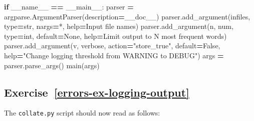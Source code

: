 \documentclass[
]{krantz}
\makeatletter
\newenvironment{Shaded}{\begin{snugshade}}{\end{snugshade}}
\newcommand{\BuiltInTok}[1]{#1}
\newcommand{\ControlFlowTok}[1]{\textcolor[rgb]{0.13,0.29,0.53}{\textbf{#1}}}
\newcommand{\NormalTok}[1]{#1}
\newcommand{\OperatorTok}[1]{\textcolor[rgb]{0.81,0.36,0.00}{\textbf{#1}}}
\newcommand{\StringTok}[1]{\textcolor[rgb]{0.31,0.60,0.02}{#1}}
\newcommand{\VariableTok}[1]{\textcolor[rgb]{0.00,0.00,0.00}{#1}}
\newenvironment{kframe}{%
\medskip{}
\setlength{\fboxsep}{.8em}
 \def\at@end@of@kframe{}%
 \ifinner\ifhmode%
  \def\at@end@of@kframe{\end{minipage}}%
  \begin{minipage}{\columnwidth}%
 \fi\fi%
 \def\FrameCommand##1{\hskip\@totalleftmargin \hskip-\fboxsep
 \colorbox{shadecolor}{##1}\hskip-\fboxsep
     \hskip-\linewidth \hskip-\@totalleftmargin \hskip\columnwidth}%
 \MakeFramed {\advance\hsize-\width
   \@totalleftmargin\z@ \linewidth\hsize
   \@setminipage}}%
 {\par\unskip\endMakeFramed%
 \at@end@of@kframe}
\renewenvironment{Shaded}{\begin{kframe}}{\end{kframe}}
\makeatother
\begin{document}
\begin{Shaded}
\begin{Highlighting}[]
\ControlFlowTok{if} \VariableTok{\_\_name\_\_} \OperatorTok{==} \StringTok{\textquotesingle{}\_\_main\_\_\textquotesingle{}}\NormalTok{:}
\NormalTok{    parser }\OperatorTok{=}\NormalTok{ argparse.ArgumentParser(description}\OperatorTok{=}\NormalTok{\_\_doc\_\_)}
\NormalTok{    parser.add\_argument(}\StringTok{\textquotesingle{}infiles\textquotesingle{}}\NormalTok{, }\BuiltInTok{type}\OperatorTok{=}\BuiltInTok{str}\NormalTok{, nargs}\OperatorTok{=}\StringTok{\textquotesingle{}*\textquotesingle{}}\NormalTok{, }\BuiltInTok{help}\OperatorTok{=}\StringTok{\textquotesingle{}Input file names\textquotesingle{}}\NormalTok{)}
\NormalTok{    parser.add\_argument(}\StringTok{\textquotesingle{}{-}n\textquotesingle{}}\NormalTok{, }\StringTok{\textquotesingle{}{-}{-}num\textquotesingle{}}\NormalTok{, }\BuiltInTok{type}\OperatorTok{=}\BuiltInTok{int}\NormalTok{, default}\OperatorTok{=}\VariableTok{None}\NormalTok{,}
                        \BuiltInTok{help}\OperatorTok{=}\StringTok{\textquotesingle{}Limit output to N most frequent words\textquotesingle{}}\NormalTok{)}
\NormalTok{    parser.add\_argument(}\StringTok{\textquotesingle{}{-}v\textquotesingle{}}\NormalTok{, }\StringTok{\textquotesingle{}{-}{-}verbose\textquotesingle{}}\NormalTok{, action}\OperatorTok{=}\StringTok{"store\_true"}\NormalTok{, default}\OperatorTok{=}\VariableTok{False}\NormalTok{,}
                        \BuiltInTok{help}\OperatorTok{=}\StringTok{"Change logging threshold from WARNING to DEBUG"}\NormalTok{)}
\NormalTok{    args }\OperatorTok{=}\NormalTok{ parser.parse\_args()}
\NormalTok{    main(args)}
\end{Highlighting}
\end{Shaded}

\hypertarget{exercise-referrors-ex-logging-output}{%
\subsection*{Exercise~\ref{errors-ex-logging-output}}\label{exercise-referrors-ex-logging-output}}


The \texttt{collate.py} script should now read as follows:
\end{document}
